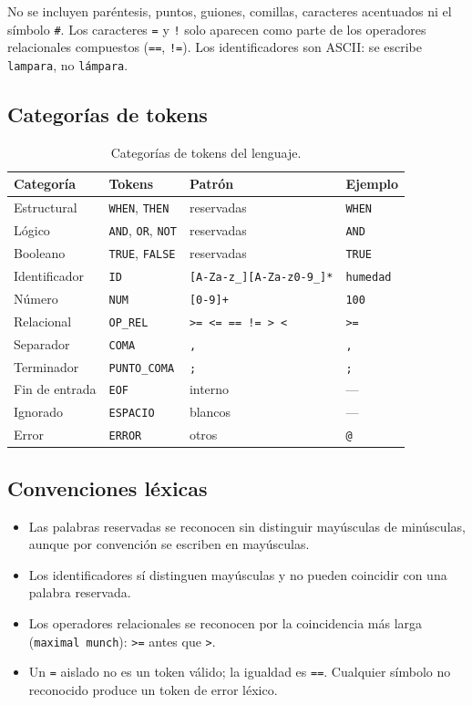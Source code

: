 \documentclass[12pt,a4paper]{article}
\begin{document}
No se incluyen paréntesis, puntos, guiones, comillas, caracteres acentuados ni
el símbolo \texttt{\#}. Los caracteres \texttt{=} y \texttt{!} solo aparecen
como parte de los operadores relacionales compuestos (\texttt{==},
\texttt{!=}). Los identificadores son ASCII: se escribe \texttt{lampara}, no
\texttt{lámpara}.

\subsection{Categorías de tokens}
\begin{table}[h!]
\centering
\begin{tabular}{llll}
\toprule
\textbf{Categoría} & \textbf{Tokens} & \textbf{Patrón} & \textbf{Ejemplo} \\
\midrule
Estructural & \texttt{WHEN}, \texttt{THEN} & reservadas & \texttt{WHEN} \\
Lógico      & \texttt{AND}, \texttt{OR}, \texttt{NOT} & reservadas & \texttt{AND} \\
Booleano    & \texttt{TRUE}, \texttt{FALSE} & reservadas & \texttt{TRUE} \\
Identificador & \texttt{ID} & \texttt{[A-Za-z\_][A-Za-z0-9\_]*} & \texttt{humedad} \\
Número      & \texttt{NUM} & \texttt{[0-9]+} & \texttt{100} \\
Relacional  & \texttt{OP\_REL} & \texttt{>= <= == != > <} & \texttt{>=} \\
Separador   & \texttt{COMA} & \texttt{,} & \texttt{,} \\
Terminador  & \texttt{PUNTO\_COMA} & \texttt{;} & \texttt{;} \\
Fin de entrada & \texttt{EOF} & interno & --- \\
Ignorado    & \texttt{ESPACIO} & blancos & --- \\
Error       & \texttt{ERROR} & otros & \texttt{@} \\
\bottomrule
\end{tabular}
\caption{Categorías de tokens del lenguaje.}
\label{tab:tokens}
\end{table}

\subsection{Convenciones léxicas}
\begin{itemize}
  \item Las palabras reservadas se reconocen sin distinguir mayúsculas de
        minúsculas, aunque por convención se escriben en mayúsculas.
  \item Los identificadores sí distinguen mayúsculas y no pueden coincidir
        con una palabra reservada.
  \item Los operadores relacionales se reconocen por la coincidencia más
        larga (\texttt{maximal munch}): \texttt{>=} antes que \texttt{>}.
  \item Un \texttt{=} aislado no es un token válido; la igualdad es
        \texttt{==}. Cualquier símbolo no reconocido produce un token de
        error léxico.
\end{itemize}
\end{document}

